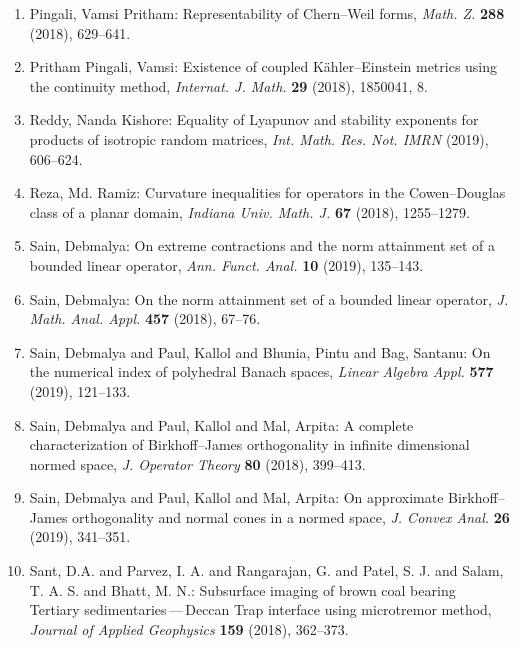 \begin{enumerate}[leftmargin=27pt]
	\item Pingali, Vamsi Pritham: Representability of {C}hern--{W}eil forms, {\em Math. Z.} {\bf 288} (2018), 629--641.

	\item Pritham Pingali, Vamsi: Existence of coupled {K}\"{a}hler--{E}instein metrics using the
	      continuity method, {\em Internat. J. Math.} {\bf 29} (2018), 1850041, 8.

	\item Reddy, Nanda Kishore: Equality of {L}yapunov and stability exponents for products of
	      isotropic random matrices, {\em Int. Math. Res. Not. IMRN} {\bf } (2019), 606--624.

	\item Reza, Md. Ramiz: Curvature inequalities for operators in the {C}owen--{D}ouglas
	      class of a planar domain, {\em Indiana Univ. Math. J.} {\bf 67} (2018), 1255--1279.

	\item Sain, Debmalya: On extreme contractions and the norm attainment set of a
	      bounded linear operator, {\em Ann. Funct. Anal.} {\bf 10} (2019), 135--143.

	\item Sain, Debmalya: On the norm attainment set of a bounded linear operator, {\em J. Math. Anal. Appl.} {\bf 457} (2018), 67--76.

	\item Sain, Debmalya and Paul, Kallol and Bhunia, Pintu and Bag,
	      Santanu: On the numerical index of polyhedral {B}anach spaces, {\em Linear Algebra Appl.} {\bf 577} (2019), 121--133.

	\item Sain, Debmalya and Paul, Kallol and Mal, Arpita: A complete characterization of {B}irkhoff--{J}ames
	      orthogonality in infinite dimensional normed space, {\em J. Operator Theory} {\bf 80} (2018), 399--413.

	\item Sain, Debmalya and Paul, Kallol and Mal, Arpita: On approximate {B}irkhoff--{J}ames orthogonality and normal
	      cones in a normed space, {\em J. Convex Anal.} {\bf 26} (2019), 341--351.

	\item\label{rangarajan:microtremor-method} Sant, D.A. and Parvez, I. A. and Rangarajan, G. and Patel, S. J. and Salam, T. A. S. and Bhatt, M. N.: Subsurface imaging of brown coal bearing Tertiary sedimentaries\,---\,Deccan Trap
	      interface using microtremor method, {\em Journal of Applied Geophysics} {\bf 159} (2018), 362--373.


\end{enumerate}
